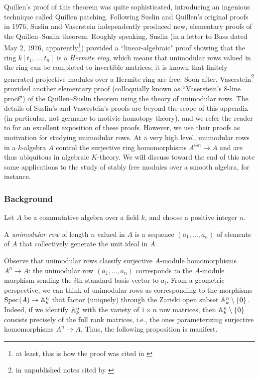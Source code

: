 Quillen's proof of this theorem was quite sophisticated, introducing an ingenious technique called Quillen patching. Following Suslin and Quillen's original proofs in 1976, Suslin and Vaserstein independently produced new, elementary proofs of the Quillen--Suslin theorem. Roughly speaking, Suslin (in a letter to Bass dated May 2, 1976, apparently\footnote{at least, this is how the proof was cited in \cite[Chapter III]{Lam-SerresProblem}}) provided a ``linear-algebraic" proof showing that the ring $k[t_1,\ldots,t_n]$ is a \textit{Hermite ring}, which means that unimodular rows valued in the ring can be completed to invertible matrices; it is known that finitely generated projective modules over a Hermite ring are free. Soon after, Vaserstein\footnote{in unpublished notes cited by \cite[Chapter III]{Lam-SerresProblem}} provided another elementary proof (colloquially known as ``Vaserstein’s 8-line proof") of the Quillen--Suslin theorem using the theory of unimodular rows. The details of Suslin's and Vaserstein's proofs are beyond the scope of this appendix (in particular, not germane to motivic homotopy theory), and we refer the reader to \cite[Chapter III]{Lam-SerresProblem} for an excellent exposition of these proofs. However, we use their proofs as motivation for studying unimodular rows. At a very high level, unimodular rows in a $k$-algebra $A$ control the surjective ring homomorphisms $A^{\oplus n} \to A$ and are thus ubiquitous in algebraic $K$-theory. We will discuss toward the end of this note some applications to the study of stably free modules over a smooth algebra, for instance.

\subsubsection{Background} 

Let $A$ be a commutative algebra over a field $k$, and choose a positive integer $n$. 

\begin{definition}
    A \textit{unimodular row} of length $n$ valued in $A$ is a sequence $(a_1,\ldots,a_n)$ of elements of $A$ that collectively generate the unit ideal in $A$.
\end{definition}

 Observe that unimodular rows classify surjective $A$-module homomorphisms $A^n \to A$: the unimodular row $(a_1,\ldots,a_n)$ corresponds to the $A$-module morphism sending the $i$th standard basis vector to $a_i$. From a geometric perspective, we can think of unimodular rows as corresponding to the morphisms $\text{Spec}\hspace{0.1em}(A) \to \mathbb{A}^n_k$ that factor (uniquely) through the Zariski open subset $\mathbb{A}^n_k\setminus\{0\}$. Indeed, if we identify $\mathbb{A}^n_k$ with the variety of $1 \times n$ row matrices, then $\mathbb{A}^n_k\setminus\{0\}$ consists precisely of the full rank matrices, i.e., the ones parameterizing surjective homomorphisms $A^n \to A$. Thus, the following proposition is manifest.

